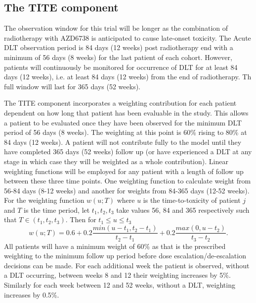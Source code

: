 \subsection{The TITE component}
\label{section2.3.2}%

The observation window for this trial will be longer as the combination of radiotherapy with AZD6738 is anticipated to cause late-onset toxicity. The Acute DLT observation period is 84 days (12 weeks) post radiotherapy end with a minimum of 56 days (8 weeks) for the last patient of each cohort. However, patients will continuously be monitored for occurrence of DLT for at least 84 days (12 weeks), i.e. at least 84 days (12 weeks) from the end of radiotherapy. Th full window will last for 365 days (52 weeks).

The TITE component incorporates a weighting contribution for each patient dependent on how long that patient has been evaluable in the study. This allows a patient to be evaluated once they have been observed for the minimum DLT period of 56 days (8 weeks). The weighting at this point is 60\% rising to 80\% at 84 days (12 weeks). A patient will not contribute fully to the model until they have completed 365 days (52 weeks) follow up (or have experienced a DLT at any stage in which case they will be weighted as a whole contribution). Linear weighting functions will be employed for any patient with a length of follow up between these three time points. One weighting function to calculate weight from 56-84 days (8-12 weeks) and another for weights from 84-365 days (12-52 weeks). For the weighting function $w(u;T)$ where $u$ is the time-to-toxicity of patient $j$ and $T$ is the time period, let $t_1, t_2, t_3$ take values 56, 84 and 365 respectively such that $T \in (t_1, t_2, t_3)$. Then for $t_1 \leq u \leq t_3$
\begin{equation}
w(u;T) = 0.6 + 0.2\frac{min(u-t_1,t_2 - t_1)}{t_2 - t_1} + 0.2\frac{max(0, u - t_2)}{t_3-t_2}.
\end{equation} 
All patients will have a minimum weight of 60\% as that is the prescribed weighting to the  minimum follow up period before dose escalation/de-escalation decisions can be made. For each additional week the patient is observed, without a DLT occurring, between weeks 8 and 12 their weighting increases by 5\%. Similarly for each week between 12 and 52 weeks, without a DLT, weighting increases by 0.5\%.

